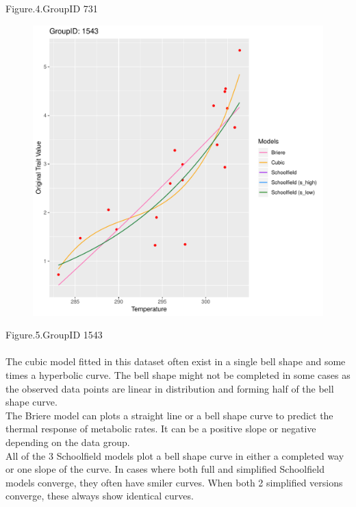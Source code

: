 \documentclass[12pt,a4paper]{article}
\begin{document}
Figure.4.GroupID 731
\\
\begin{figure}[H]
\centering
\includegraphics[width=\textwidth]{example5.pdf}
\end{figure}
Figure.5.GroupID 1543
\\
\\
The cubic model fitted in this dataset often exist in a single bell shape and some times a hyperbolic curve. The bell shape might not be completed in some cases as the observed data points are linear in distribution and forming half of the bell shape curve.
\\
The Briere model can plots a straight line or a bell shape curve to predict the thermal response of metabolic rates. It can be a positive slope or negative depending on the data group.
\\
All of the 3 Schoolfield models plot a bell shape curve in either a completed way or one slope of the curve. In cases where both full and simplified Schoolfield models converge, they often have smiler curves. When both 2 simplified versions converge, these always show identical curves.
\end{document}
